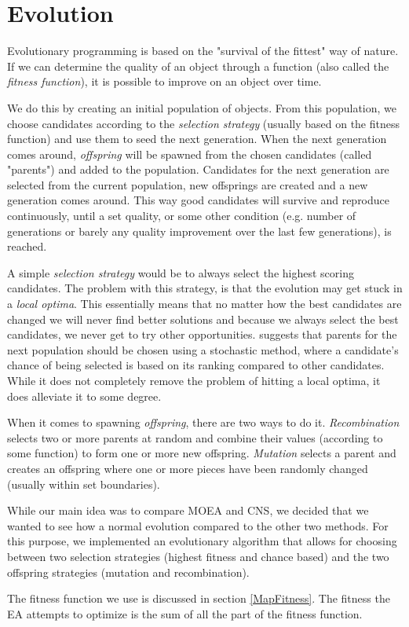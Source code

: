 \section{Evolution}
\label{Evolution}

Evolutionary programming\cite{IoEC, eiben2002evolutionary} is based on the "survival of the fittest" way of nature. If we can determine the quality of an object through a function (also called the \textit{fitness function}), it is possible to improve on an object over time.

We do this by creating an initial population of objects. From this population, we choose candidates according to the \textit{selection strategy} (usually based on the fitness function) and use them to seed the next generation. When the next generation comes around, \textit{offspring} will be spawned from the chosen candidates (called "parents") and added to the population. Candidates for the next generation are selected from the current population, new offsprings are created and a new generation comes around. This way good candidates will survive and reproduce continuously, until a set quality, or some other condition (e.g. number of generations or barely any quality improvement over the last few generations), is reached.

A simple \textit{selection strategy} would be to always select the highest scoring candidates. The problem with this strategy, is that the evolution may get stuck in a \textit{local optima}. This essentially means that no matter how the best candidates are changed we will never find better solutions and because we always select the best candidates, we never get to try other opportunities. \citeauthor{rocha1999preventing}\cite{rocha1999preventing} suggests that parents for the next population should be chosen using a stochastic method, where a candidate's chance of being selected is based on its ranking compared to other candidates. While it does not completely remove the problem of hitting a local optima, it does alleviate it to some degree.

When it comes to spawning \textit{offspring}, there are two ways to do it\cite[Chapter 2]{PCGBook}. \textit{Recombination} selects two or more parents at random and combine their values (according to some function) to form one or more new offspring. \textit{Mutation} selects a parent and creates an offspring where one or more pieces have been randomly changed (usually within set boundaries). 

While our main idea was to compare MOEA and CNS, we decided that we wanted to see how a normal evolution compared to the other two methods. For this purpose, we implemented an evolutionary algorithm that allows for choosing between two selection strategies (highest fitness and chance based) and the two offspring strategies (mutation and recombination). 

The fitness function we use is discussed in section \ref{MapFitness}. The fitness the EA attempts to optimize is the sum of all the part of the fitness function.